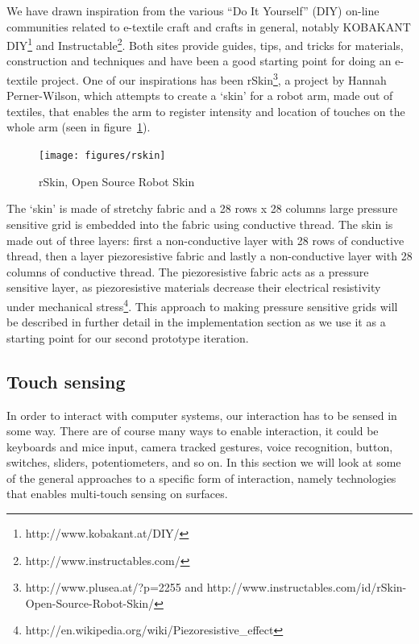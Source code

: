 We have drawn inspiration from the various ``Do It Yourself'' (DIY) on-line communities related to e-textile craft and crafts in general, notably KOBAKANT DIY\footnote{http://www.kobakant.at/DIY/} and Instructable\footnote{http://www.instructables.com/}.
Both sites provide guides, tips, and tricks for materials, construction and techniques and have been a good starting point for doing an e-textile project.
One of our inspirations has been rSkin\footnote{http://www.plusea.at/?p=2255 and http://www.instructables.com/id/rSkin-Open-Source-Robot-Skin/}, a project by Hannah Perner-Wilson, which attempts to create a `skin' for a robot arm, made out of textiles, that enables the arm to register intensity and location of touches on the whole arm (seen in figure~\ref{rskin}).

\begin{figure}[h]
  \centering
  \begin{minipage}[b]{.8\textwidth}
    \centering
    \texttt{[image: figures/rskin]}
  	\caption{rSkin, Open Source Robot Skin}
    \label{rskin}
    \end{minipage}
\end{figure}

The `skin' is made of stretchy fabric and a 28 rows x 28 columns large pressure sensitive grid is embedded into the fabric using conductive thread.
The skin is made out of three layers: first a non-conductive layer with 28 rows of conductive thread, then a layer piezoresistive fabric and lastly a non-conductive layer with 28 columns of conductive thread.
The piezoresistive fabric acts as a pressure sensitive layer, as piezoresistive materials decrease their electrical resistivity under mechanical stress\footnote{http://en.wikipedia.org/wiki/Piezoresistive\_effect}.
This approach to making pressure sensitive grids will be described in further detail in the implementation section as we use it as a starting point for our second prototype iteration.

\subsection{Touch sensing}
\label{ch:textiletouch:related:touch}
In order to interact with computer systems, our interaction has to be sensed in some way.
There are of course many ways to enable interaction, it could be keyboards and mice input, camera tracked gestures, voice recognition, button, switches, sliders, potentiometers, and so on.
In this section we will look at some of the general approaches to a specific form of interaction, namely technologies that enables multi-touch sensing on surfaces.

